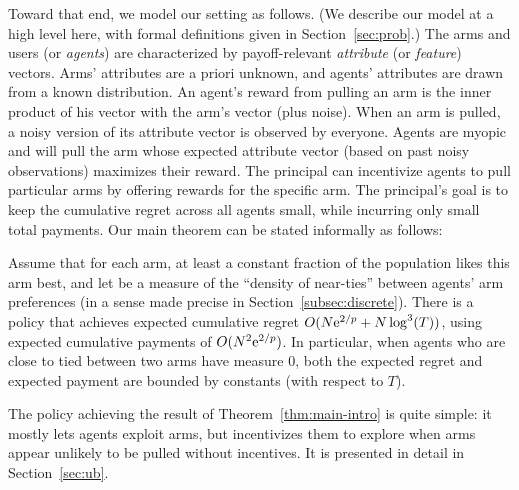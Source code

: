 Toward that end, we model our setting as follows.
(We describe our model at a high level here,
with formal definitions given in Section~\ref{sec:prob}.)
The \ARMNUM arms and users (or \emph{agents})
are characterized by payoff-relevant
\emph{attribute} (or \emph{feature}) vectors.
Arms' attributes are a priori unknown,
and agents' attributes are drawn from a known distribution.
An agent's reward from pulling an arm is the inner product of his
vector with the arm's vector (plus noise).
When an arm is pulled, a noisy version of its attribute vector is
observed by everyone.
Agents are myopic and will pull the arm whose expected attribute
vector (based on past noisy observations) maximizes their reward.
The principal can incentivize agents to pull particular arms by
offering rewards for the specific arm.
The principal's goal is to keep the cumulative regret across all
agents small, while incurring only small total payments.
Our main theorem can be stated informally as follows:

\begin{theorem} \label{thm:main-intro}
Assume that for each arm, at least a constant fraction \MinProb
of the population likes this arm best,
and let \TieDensity be a measure of the ``density of near-ties''
between agents' arm preferences
(in a sense made precise in Section~\ref{subsec:discrete}).
There is a policy that achieves expected 
cumulative regret $O (N \mathrm{e}^{2/p} + N \log^3(T))$,
using expected cumulative payments of $O(N^2 \mathrm{e}^{2/p})$.
In particular, when agents who are close to tied between two arms have measure $0$,
both the expected regret and expected payment are bounded by constants
(with respect to $T$). 
\end{theorem}

The policy achieving the result of Theorem~\ref{thm:main-intro} is
quite simple: it mostly lets agents exploit arms, but incentivizes
them to explore when arms appear unlikely to be pulled without incentives.
It is presented in detail in Section~\ref{sec:ub}.
